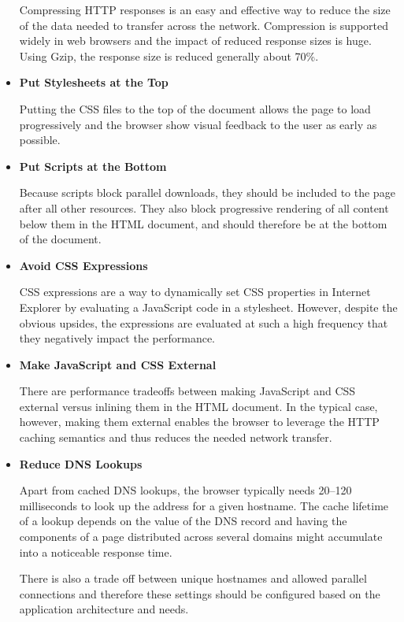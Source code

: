 \begin{itemize}
  Compressing HTTP responses is an easy and effective way to reduce
  the size of the data needed to transfer across the
  network. Compression is supported widely in web browsers and the
  impact of reduced response sizes is huge. Using Gzip, the response
  size is reduced generally about 70\%.

\item \textbf{Put Stylesheets at the Top}

  Putting the CSS files to the top of the document allows the page to
  load progressively and the browser show visual feedback to the user
  as early as possible.

\item \textbf{Put Scripts at the Bottom}

  Because scripts block parallel downloads, they should be included to
  the page after all other resources. They also block progressive
  rendering of all content below them in the HTML document, and should
  therefore be at the bottom of the document.

\item \textbf{Avoid CSS Expressions}

  CSS expressions are a way to dynamically set CSS properties in
  Internet Explorer by evaluating a JavaScript code in a
  stylesheet. However, despite the obvious upsides, the expressions
  are evaluated at such a high frequency that they negatively impact
  the performance.

\item \textbf{Make JavaScript and CSS External}

  There are performance tradeoffs between making JavaScript and CSS
  external versus inlining them in the HTML document. In the typical
  case, however, making them external enables the browser to leverage
  the HTTP caching semantics and thus reduces the needed network
  transfer.

\item \textbf{Reduce DNS Lookups}

  Apart from cached DNS lookups, the browser typically needs 20--120
  milliseconds to look up the  address for a given
  hostname. The cache lifetime of a lookup depends on the 
  value of the DNS record and having the components of a page
  distributed across several domains might accumulate into a
  noticeable response time.

  There is also a trade off between unique hostnames and allowed
  parallel connections and therefore these settings should be
  configured based on the application architecture and needs.


\end{itemize}
